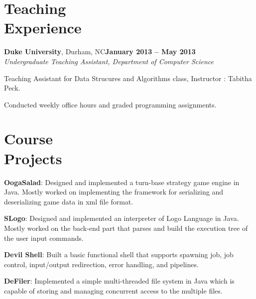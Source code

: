 \documentclass[10pt,margin,line]{cv}
\begin{document}
\begin{resume}
    \section{\mysidestyle Teaching\\Experience}
    \textbf{Duke University}, Durham, NC\hfill \textbf{January 2013 -- May 2013} \vspace{1mm}\\\vspace{0mm}%
    \textsl{Undergraduate Teaching Assistant, Department of Computer Science}
    \begin{list3}
        \item Teaching Assistant for Data Strucures and Algorithms class, Instructor : Tabitha Peck.
        \item Conducted weekly office hours and graded programming assignments.
  \end{list3}


  \section{\mysidestyle Course\\Projects}
  \begin{list3}
        \item \textbf{OogaSalad}: Designed and implemented a turn-base strategy game engine in Java. Mostly worked on implementing the framework for serializing and deserializing game data in xml file format.\vspace{1mm}
    \item \textbf{SLogo}: Designed and implemented an interpreter of Logo Language in Java. Mostly worked on the back-end part that parses and build the execution tree of the user input commands.\vspace{1mm}
        \item \textbf{Devil Shell}: Built a basic functional shell that supports spawning job, job control, input/output redirection, error handling, and pipelines.
        \item \textbf{DeFiler}: Implemented a simple multi-threaded file system in Java which is capable of storing and managing concurrent access to the multiple files.
  \end{list3}

  \vspace{1mm}%

\end{resume}
\end{document}
